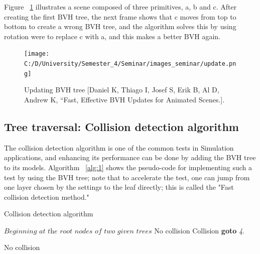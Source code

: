 \documentclass[11pt,a4paper]{article}
\begin{document}
	Figure ~\ref{fig:4} illustrates a scene composed of three primitives, a, b and c. After creating the first BVH tree, the next frame shows that c moves from top to bottom to create a wrong BVH tree, and the algorithm solves this by using rotation were to replace c with a, and this makes a better BVH again. 
	
	\begin{figure}[h]
		\begin{center}
			\texttt{[image: C:/D/University/Semester\_4/Seminar/images\_seminar/update.png]}
			
			\caption{Updating BVH tree [Daniel K, Thiago I, Josef S, Erik B, Al D, Andrew K, “Fast, Effective BVH Updates for Animated Scenes.].}
			\label{fig:4}
		\end{center}
	\end{figure}
	
	
	
	\subsection{Tree traversal: Collision detection algorithm}
	The collision detection algorithm is one of the common tests in Simulation applications, and enhancing its performance can be done by adding the BVH tree to its models. 
	Algorithm ~\ref{alg:1} shows the pseudo-code for implementing such a test by using the BVH tree; note that to accelerate the test, one can jump from one layer chosen by the settings to the leaf directly; this is called the "Fast collision detection method."
	
	\begin{algorithm}[H]
		\caption{Collision detection algorithm}\label{euclid}
		\begin{algorithmic}[1]
			\State $\textit{Beginning at the root nodes of two given trees}$
			 \Return No collision
			\Else
			 \Return  Collision
			\EndIf
			\Else		
			\State \textbf{goto} \emph{4}.
			\EndIf
			\EndIf
			
			 \Return No collision
			\EndIf
			\EndProcedure
		\end{algorithmic}
		\label{alg:1}
	\end{algorithm}
	
	\clearpage
\end{document}
